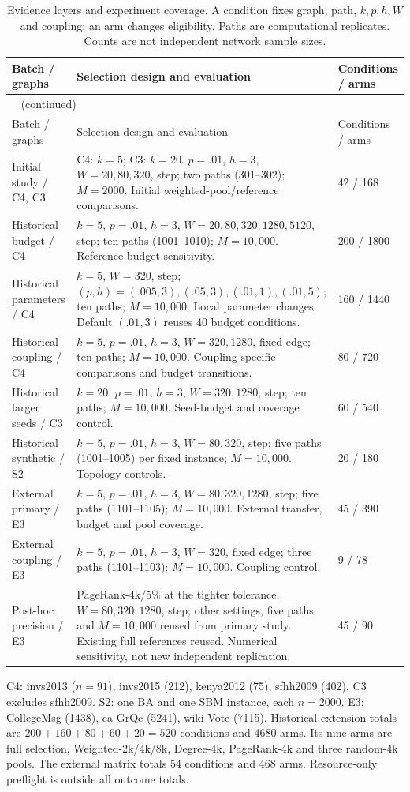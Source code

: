 \begin{longtable}{p{.23\linewidth}p{.51\linewidth}p{.14\linewidth}}
\caption{Evidence layers and experiment coverage. A condition fixes graph, path, $k,p,h,W$ and coupling; an arm changes eligibility. Paths are computational replicates. Counts are not independent network sample sizes.}\label{tab:hist-coverage}\\
\toprule Batch / graphs & Selection design and evaluation & Conditions / arms\\\midrule\endfirsthead
\multicolumn{3}{l}{\tablename~\thetable{} (continued)}\\\toprule
Batch / graphs & Selection design and evaluation & Conditions / arms\\\midrule\endhead\bottomrule\endfoot
Initial study / C4, C3 & C4: $k=5$; C3: $k=20$. $p=.01$, $h=3$, $W=20,80,320$, step; two paths (301--302); $M=2000$. Initial weighted-pool/reference comparisons. & 42 / 168\\
Historical budget / C4 & $k=5$, $p=.01$, $h=3$, $W=20,80,320,1280,5120$, step; ten paths (1001--1010); $M=10{,}000$. Reference-budget sensitivity. & 200 / 1800\\
Historical parameters / C4 & $k=5$, $W=320$, step; $(p,h)=(.005,3),(.05,3),(.01,1),(.01,5)$; ten paths; $M=10{,}000$. Local parameter changes. Default $(.01,3)$ reuses 40 budget conditions. & 160 / 1440\\
Historical coupling / C4 & $k=5$, $p=.01$, $h=3$, $W=320,1280$, fixed edge; ten paths; $M=10{,}000$. Coupling-specific comparisons and budget transitions. & 80 / 720\\
Historical larger seeds / C3 & $k=20$, $p=.01$, $h=3$, $W=320,1280$, step; ten paths; $M=10{,}000$. Seed-budget and coverage control. & 60 / 540\\
Historical synthetic / S2 & $k=5$, $p=.01$, $h=3$, $W=80,320$, step; five paths (1001--1005) per fixed instance; $M=10{,}000$. Topology controls. & 20 / 180\\
External primary / E3 & $k=5$, $p=.01$, $h=3$, $W=80,320,1280$, step; five paths (1101--1105); $M=10{,}000$. External transfer, budget and pool coverage. & 45 / 390\\
External coupling / E3 & $k=5$, $p=.01$, $h=3$, $W=320$, fixed edge; three paths (1101--1103); $M=10{,}000$. Coupling control. & 9 / 78\\
Post-hoc precision / E3 & PageRank-4k/5\% at the tighter tolerance, $W=80,320,1280$, step; other settings, five paths and $M=10{,}000$ reused from primary study. Existing full references reused. Numerical sensitivity, not new independent replication. & 45 / 90\\
\end{longtable}
\noindent C4: invs2013 ($n=91$), invs2015 (212), kenya2012 (75), sfhh2009 (402).
C3 excludes sfhh2009. S2: one BA and one SBM instance, each $n=2000$.
E3: CollegeMsg (1438), ca-GrQc (5241), wiki-Vote (7115).
Historical extension totals are $200+160+80+60+20=520$ conditions and 4680 arms.
Its nine arms are full selection, Weighted-2k/4k/8k, Degree-4k, PageRank-4k and three random-4k pools.
The external matrix totals 54 conditions and 468 arms. Resource-only preflight is outside all outcome totals.

